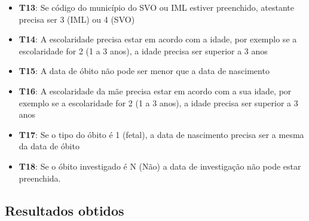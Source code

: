 \documentclass[
  12,
  table]{proadi}
\begin{document}
\begin{itemize}
\item
  \textbf{T13}: Se código do município do SVO ou IML estiver preenchido,
  atestante precisa ser 3 (IML) ou 4 (SVO)
\item
  \textbf{T14}: A escolaridade precisa estar em acordo com a idade, por
  exemplo se a escolaridade for 2 (1 a 3 anos), a idade precisa ser
  superior a 3 anos
\item
  \textbf{T15}: A data de óbito não pode ser menor que a data de
  nascimento
\item
  \textbf{T16}: A escolaridade da mãe precisa estar em acordo com a sua
  idade, por exemplo se a escolaridade for 2 (1 a 3 anos), a idade
  precisa ser superior a 3 anos
\item
  \textbf{T17}: Se o tipo do óbito é 1 (fetal), a data de nascimento
  precisa ser a mesma da data de óbito
\item
  \textbf{T18}: Se o óbito investigado é N (Não) a data de investigação
  não pode estar preenchida.
\end{itemize}

\hypertarget{resultados-obtidos}{%
\subsection*{Resultados obtidos}\label{resultados-obtidos}}

\begingroup\fontsize{10}{12}\selectfont
\end{document}
